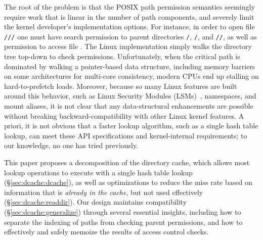 The root of the problem is that the POSIX path permission semantics
seemingly require work that is linear in the number of path components,
and severely limit the kernel developer's implementation options.
For instance, in order to open file {\tt /\fnone{}/\fntwo{}/\fnthree{}} 
one must have search permission
to parent directories {\tt /}, {\tt /\fnone{}}, and {\tt /\fnone{}/\fntwo{}},
as well as permission to access file {\tt \fnthree{}}.
The Linux implementation %
simply walks the directory
tree top-down to check permissions.  
Unfortunately, when the critical path is dominated by 
walking a pointer-based data structure, 
including memory barriers on some architectures for multi-core consistency, 
modern CPUs end up stalling on hard-to-prefetch loads.
Moreover, because so many Linux features are built around this behavior, such as Linux Security Modules (LSMs)~\citep{wright+lsm},
namespaces, and mount aliases, it is not clear that any data-structural enhancements
are possible without breaking backward-compatibility with other Linux kernel features.
A priori, it is not obvious that a faster lookup algorithm, such as a single hash table lookup, 
can meet these API specifications and kernel-internal requirements; to our knowledge,
no one has tried previously.

This paper proposes a decomposition of the directory cache, which allows
most lookup operations to execute with a single hash table lookup (\S\ref{sec:dcache:dcache}),
as well as optimizations to reduce the miss rate based on information that is {\em already in the cache}, but not used effectively (\S\ref{sec:dcache:readdir}).
Our design maintains compatibility (\S\ref{sec:dcache:generalize}) through 
several essential insights, including 
how to separate the indexing of paths from checking parent permissions,
and how to effectively and safely memoize the results of access control checks.



